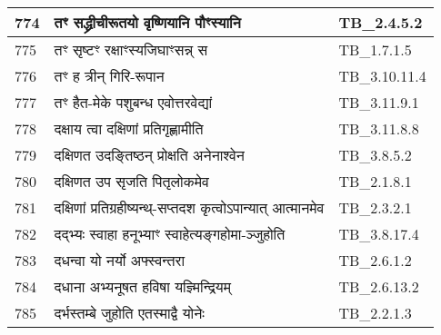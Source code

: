 \documentclass[17pt]{extarticle}
\begin{document}
\begin{longtable}{||p{0.4in}||p{4.9in}||p{0.9in}||}
    \hline
        
    774 & तꣳ सद्ध्रीचीरूतयो वृष्णियानि पौꣳस्यानि & TB\_2.4.5.2       \\
    
    \hline
        
    775 & तꣳ सृष्टꣳ रक्षाꣳस्यजिघाꣳसन्न् स & TB\_1.7.1.5       \\
    
    \hline
        
    776 & तꣳ ह त्रीन् गिरि{-}रूपान & TB\_3.10.11.4       \\
    
    \hline
        
    777 & तꣳ हैत{-}मेके पशुबन्ध एवोत्तरवेद्यां & TB\_3.11.9.1       \\
    
    \hline
        
    778 & दक्षाय त्वा दक्षिणां प्रतिगृह्णामीति & TB\_3.11.8.8       \\
    
    \hline
        
    779 & दक्षिणत उदङ्तिष्ठन् प्रोक्षति अनेनाश्वेन & TB\_3.8.5.2       \\
    
    \hline
        
    780 & दक्षिणत उप सृजति पितृलोकमेव & TB\_2.1.8.1       \\
    
    \hline
        
    781 & दक्षिणां प्रतिग्रहीष्यन्थ्{-}सप्तदश कृत्वोऽपान्यात् आत्मानमेव & TB\_2.3.2.1       \\
    
    \hline
        
    782 & दद्भ्यः स्वाहा हनूभ्याꣳ स्वाहेत्यङ्गहोमा{-}ञ्जुहोति & TB\_3.8.17.4       \\
    
    \hline
        
    783 & दधन्वा यो नर्यो अफ्स्वन्तरा & TB\_2.6.1.2       \\
    
    \hline
        
    784 & दधाना अभ्यनूषत हविषा यज्ञ्मिन्द्रियम् & TB\_2.6.13.2       \\
    
    \hline
        
    785 & दर्भस्तम्बे जुहोति एतस्माद्वै योनेः & TB\_2.2.1.3       \\
    
    \hline
        

\end{longtable}
\end{document}

